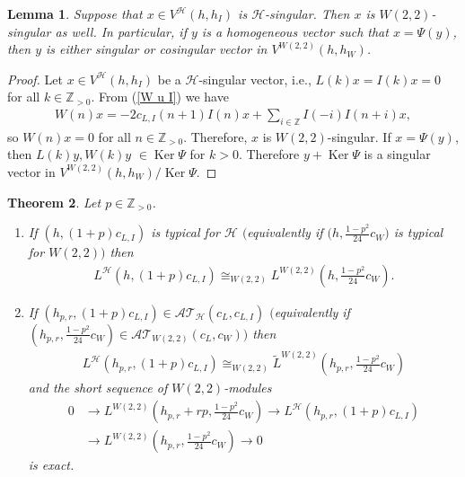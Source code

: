 \documentclass[11pt]{article}
\numberwithin{equation}{section}
\newtheorem{Theorem}{Theorem}[section]
\newtheorem{Lemma}[Theorem]{Lemma}
\newcommand{\N}{{\mathbb Z}_{> 0} }
\newcommand{\Z}{\mathbb Z}
\newcommand{\HVir}{\mathcal H}
\DeclareMathOperator{\Ker}{Ker}
\begin{document}
\begin{Lemma}\label{H-sing je W-sing}Suppose that $x\in V^{\HVir}(h,h_I)$ is $\HVir$-singular. Then $x$ is $W(2,2)$-singular as well. In particular, if $y$ is a homogeneous vector such that $x = \Psi(y)$, then $y$ is either singular or cosingular vector in $V^{W(2,2)}(h,h_W)$.
\end{Lemma}

\begin{proof}
Let $x\in V^{\HVir}(h,h_I)$ be a $\HVir$-singular vector, i.e., $L(k)x=I(k)x=0$ for all $k\in\N$. From (\ref{W u I}) we have
\begin{gather*}
W(n)x = -2c_{L,I}(n+1) I(n)x+\sum_{i\in \Z}I(-i)I(n+i)x,
\end{gather*}
so $W(n)x=0$ for all $n\in\N$. Therefore, $x$ is $W(2,2)$-singular.
If $x=\Psi(y)$, then $L(k)y, W(k)y$ $\in \Ker \Psi$ for $k>0$. Therefore $y + \Ker \Psi$ is a singular vector in $V^{W(2,2)}(h,h_W) / \Ker \Psi$.
\end{proof}

\begin{Theorem} \label{t33} \label{L za +}Let $p\in\N$.
\begin{enumerate}\itemsep=0pt
\item[$(i)$] If $(h,(1+p) c_{L,I})$ is typical for $\HVir$ $($equivalently if $\big(h,\frac{1-p^{2}}{24}c_{W}\big) $ is typical for $W(2,2))$ then
\begin{gather}
L^{\HVir}(h,(1+p) c_{L,I}) \cong_{W(2,2) }L^{W(2,2)}\left( h,\frac{1-p^{2}}{24}c_{W}\right).\label{L + gen}
\end{gather}

\item[$(ii)$] If $(h_{p,r},(1+p) c_{L,I}) \in {\mathcal {AT} }_{\HVir} ( c_L, c_{L,I} )$ $($equivalently if $ (h_{p,r},\frac{1-p^{2}}{24}c_{W}) \in {\mathcal {AT} }_{W(2,2)} ( c_L, c_W ))$ then
\begin{gather*}
L^{\HVir}(h_{p,r},(1+p) c_{L,I}) \cong_{W(2,2) }\widetilde{L}^{W(2,2)}\left( h_{p,r},\frac{1-p^{2}}{24}c_{W}\right) %
\end{gather*}
and the short sequence of $W(2,2)$-modules
\begin{align}
0 & \rightarrow L^{W(2,2)}\left( h_{p,r}+rp,\frac{1-p^{2}}{24}c_{W}\right)\rightarrow L^{\HVir}(h_{p,r},(1+p) c_{L,I}) \label{seq +} \\
& \rightarrow L^{W(2,2)}\left( h_{p,r},\frac{1-p^{2}}{24}c_{W}\right) \rightarrow0 \nonumber
\end{align}
is exact.
\end{enumerate}
\end{Theorem}
\end{document}
